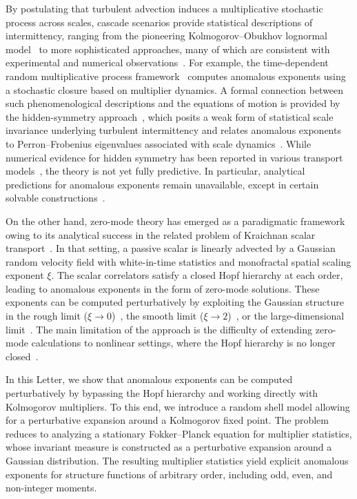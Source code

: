 \documentclass[aps,twocolumn,superscriptaddress]{revtex4-2}
\begin{document}
By postulating that turbulent advection induces a multiplicative stochastic process across scales, cascade scenarios provide statistical descriptions of intermittency, ranging from the pioneering Kolmogorov--Obukhov lognormal model~\cite{kolmogorov1962refinement} to more sophisticated approaches, many of which are consistent with experimental and numerical observations~\cite{benzi1993intermittency,dubrulle1994intermittency,eyink2003gibbsian,chen2003kolmogorov,ruffenach2026spatio}. For example, the time-dependent random multiplicative process framework~\cite{benzi2003intermittency} computes anomalous exponents using a stochastic closure based on multiplier dynamics. A formal connection between such phenomenological descriptions and the equations of motion is provided by the hidden-symmetry approach~\cite{mailybaev2021hidden,mailybaev2022hiddenMT}, which posits a weak form of statistical scale invariance underlying turbulent intermittency and relates anomalous exponents to Perron--Frobenius eigenvalues associated with scale dynamics~\cite{mailybaev2022hidden,mailybaev2023hidden}.
While numerical evidence for hidden symmetry has been reported in various transport models~\cite{thalabard2024zero,magacho2025scale,calascibetta2025hidden}, the theory is not yet fully predictive. In particular, analytical predictions for anomalous exponents remain unavailable, except in certain solvable constructions~\cite{mailybaev2021solvable}.

On the other hand, zero-mode theory has emerged as a paradigmatic framework owing to its analytical success in the related problem of Kraichnan scalar transport~\cite{falkovich2001particles,cardy2008non}. In that setting, a passive scalar is linearly advected by a Gaussian random velocity field with white-in-time statistics and monofractal spatial scaling exponent $\xi$. The scalar correlators satisfy a closed Hopf hierarchy at each order, leading to anomalous exponents in the form of zero-mode solutions. These exponents can be computed perturbatively by exploiting the Gaussian structure in the rough limit ($\xi\to0$)~\cite{gawedzki1995anomalous,vergassola1997structures}, the smooth limit ($\xi\to2$)~\cite{pumir1997perturbation,shraiman2000scalar}, or the large-dimensional limit~\cite{chertkov1996anomalous}.
The main limitation of the approach is the difficulty of extending zero-mode calculations to nonlinear settings, where the Hopf hierarchy is no longer closed~\cite{arad2001statistical,angheluta2006anomalous}.

In this Letter, we show that anomalous exponents can be computed perturbatively by bypassing the Hopf hierarchy and working directly with Kolmogorov multipliers. To this end, we introduce a random shell model allowing for a perturbative expansion around a Kolmogorov fixed point.
The problem reduces to analyzing a stationary Fokker--Planck equation for multiplier statistics, whose invariant measure is constructed as a perturbative expansion around a Gaussian distribution.
The resulting multiplier statistics yield explicit anomalous exponents for structure functions of arbitrary order, including odd, even, and non-integer moments.
\end{document}
